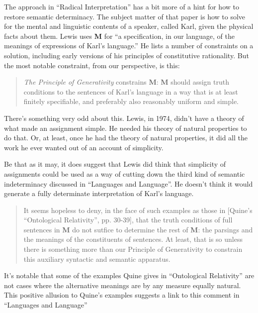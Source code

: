 The approach in ``Radical Interpretation'' has a bit more of a hint for how to restore semantic determinacy. The subject matter of that paper is how to solve for the mental and linguistic contents of a speaker, called Karl, given the physical facts about them. Lewis uses \textbf{M} for ``a specification, in our language, of the meanings of expressions of Karl's language.'' \citep[333]{Lewis1974c} He lists a number of constraints on a solution, including early versions of his principles of constitutive rationality. But the most notable constraint, from our perspective, is this:

\begin{quote}
\textit{The Principle of Generativity} constrains \textbf{M}: \textbf{M} should assign truth conditions to the sentences of Karl's language in a way that is at least finitely specifiable, and preferably also reasonably uniform and simple.  \citep[339]{Lewis1974c}
\end{quote}

\noindent There's something very odd about this. Lewis, in 1974, didn't have a theory of what made an assignment simple. He needed his theory of natural properties to do that. Or, at least, once he had the theory of natural properties, it did all the work he ever wanted out of an account of simplicity.

Be that as it may, it does suggest that Lewis did think that simplicity of assignments could be used as a way of cutting down the third kind of semantic indeterminacy discussed in ``Languages and Language''. He doesn't think it would generate a fully determinate interpretation of Karl's language.

\begin{quote}
It seems hopeless to deny, in the face of such examples as those in [Quine's ``Ontological Relativity'', pp. 30-39], that the truth conditions of full sentences in \textbf{M} do not sutfice to determine the rest of \textbf{M}: the parsings and the meanings of the constituents of sentences. At least, that is so unless there is something more than our Principle of Generativity to constrain this auxiliary syntactic and semantic apparatus. \citep[342-3]{Lewis1974c}
\end{quote}

\noindent It's notable that some of the examples Quine gives in ``Ontological Relativity'' are not cases where the alternative meanings are by any measure equally natural. This positive allusion to Quine's examples suggests a link to this comment in ``Languages and Language''

